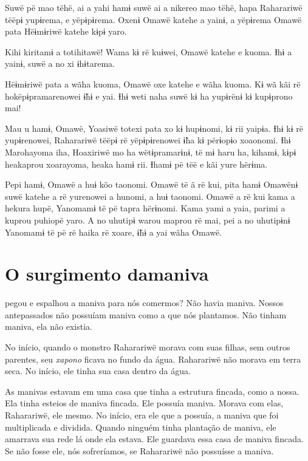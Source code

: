 Suwë pë mao tëhë, ai a yahi hamɨ suwë ai a nikereo mao tëhë, hapa
Raharariwë tëëpɨ yupɨrema, e yëpɨpɨrema. Oxenɨ Omawë katehe a yainɨ, a
yëpɨrema Omawë pata Hëɨmɨriwë katehe kɨpɨ yaro. 

Kihi kiritamɨ a totihitawë! Wama kɨ rë kuɨwei, Omawë katehe e kuoma. Ɨhɨ
a yainɨ, suwë a no xi ɨhɨtarema. 

Hëɨmɨriwë pata a wãha kuoma, Omawë oxe katehe e wãha kuoma. Kɨ wã kãi rë
hokëpɨpramarenowei ɨ̃hɨ e yai. Ɨhɨ weti naha suwë kɨ ha yupɨrënɨ kɨ
kupɨprono mai! 

Mau u hamɨ, Omawë, Yoasiwë totexi pata xo kɨ hupɨnomi, kɨ rii yaipɨa.
Ɨhɨ kɨ rë yupɨrenowei, Raharariwë tëëpɨ rë yëpɨpɨrenowei ɨ̃ha kɨ përɨopɨo
xoaonomi. Ɨhɨ Marohayoma iha, Hoaxiriwë mo ha wëtɨpramarɨnɨ, të mɨ haru
ha, kihamɨ, kɨpɨ heakaprou xoarayoma, heaka hamɨ rii. Ɨhamɨ pë tëë e kãi
yure hërɨma. 

Pepi hamɨ, Omawë a huɨ kõo taonomi. Omawë të ã rë kui, pita hamɨ Omawënɨ
suwë katehe a rë yurenowei a hunomi, a huɨ taonomi. Omawë a rë kui kama
a hekura hupë, Yanomamɨ të pë tapra hërɨnomi. Kama yami a yaia, parimi a
kuprou puhiopë yaro. A no uhutipɨ warou maprou rë mai, pei a no
uhutipɨnɨ Yanomamɨ të pë rë haika rë xoare, ɨ̃hɨ a yai wãha Omawë. 

\chapter[O surgimento da maniva]{O surgimento da\break maniva}
 
 pegou e espalhou a maniva para nós comermos? Não havia maniva.
Nossos antepassados não possuíam maniva como a que nós plantamos. Não
tinham maniva, ela não existia. 

No início, quando o monstro Raharariwë morava com suas filhas, sem outros
parentes, seu \textit{xapono} ficava no fundo da água. Raharariwë não morava em
terra seca. No início, ele tinha sua casa dentro da água. 

As manivas estavam em uma casa que tinha a estrutura fincada, como a
nossa. Ela tinha esteios de maniva fincada. Ele possuía maniva. Morava
com elas, Raharariwë, ele mesmo. No início, era ele que a possuía, a
maniva que foi multiplicada e dividida. Quando ninguém tinha plantação
de maniva, ele amarrava sua rede lá onde ela estava. Ele guardava essa casa
de maniva fincada. Se não fosse ele, nós sofreríamos, se Raharariwë não
possuísse a maniva. 

